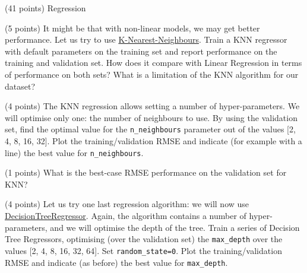 \documentclass[12pt]{article}
\begin{document}
\begin{question}{\label{Q_LR_BA}(41 points) Regression}
\begin{subquestion}



\end{subquestion}

\begin{subquestion}{(5 points) It might be that with non-linear models, we may get better performance. Let us try to use \href{https://scikit-learn.org/stable/modules/generated/sklearn.neighbors.KNeighborsRegressor.html}{K-Nearest-Neighbours}. Train a KNN regressor with default parameters on the training set and report performance on the training and validation set.  How does it compare with Linear Regression in terms of performance on both sets? What is a limitation of the KNN algorithm for our dataset?}






\end{subquestion}

\begin{subquestion}{(4 points) The KNN regression allows setting a number of hyper-parameters. We will optimise only one: the number of neighbours to use. By using the validation set, find the optimal value for the \texttt{n\_neighbours} parameter out of the values [2, 4, 8, 16, 32]. Plot the training/validation RMSE and indicate (for example with a line) the best value for \texttt{n\_neighbours}.}






\end{subquestion}

\begin{subquestion}{(1 points) What is the best-case RMSE performance on the validation set for KNN?}






\end{subquestion}

\begin{subquestion}{(4 points) Let us try one last regression algorithm: we will now use \href{https://scikit-learn.org/stable/modules/generated/sklearn.tree.DecisionTreeRegressor.html}{DecisionTreeRegressor}. Again, the algorithm contains a number of hyper-parameters, and we will optimise the depth of the tree. Train a series of Decision Tree Regressors, optimising (over the validation set) the \texttt{max\_depth} over the values [2, 4, 8, 16, 32, 64]. Set \texttt{random\_state=0}. Plot the training/validation RMSE and indicate (as before) the best value for \texttt{max\_depth}.}




\end{subquestion}
\end{question}
\end{document}
